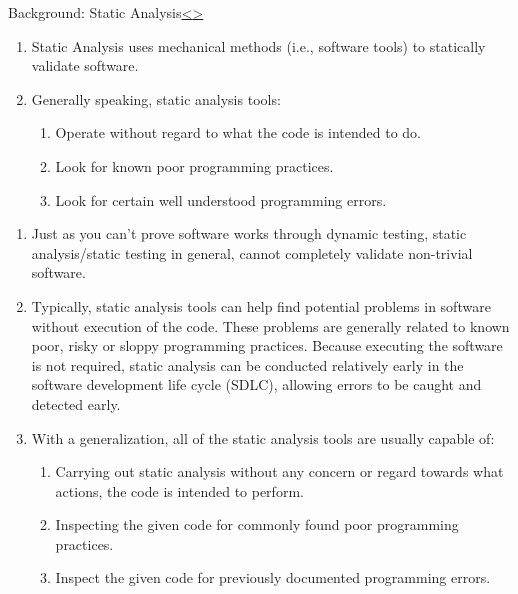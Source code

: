 \documentclass[12pt]{extarticle}
\newenvironment{instructionblock}{\Large\bgroup}{\egroup}
\newcommand{\ben}{\begin{enumerate}}
\newcommand{\een}{\end{enumerate}}
\begin{document}


\pagebreak
\begin{slide}{Background: Static Analysis}{\hyperref[slide 7]{\textless}\hyperref[slide 9]{\textgreater}}
	\vskip 10pt
	\begin{instructionblock}
		\begin{enumerate}
			\item Static Analysis uses mechanical methods (i.e., software tools) to statically validate software\cite{StaticAnalysisTools}.
			\item Generally speaking, static analysis tools:
			\ben
			\item Operate without regard to what the code is intended to do\cite{StaticAnalysisTools}.
			\item Look for known poor programming practices\cite{StaticAnalysisTools}.
			\item Look for certain well understood programming errors\cite{StaticAnalysisTools}.
			\een
		\end{enumerate}
	\end{instructionblock}
\end{slide}
\begin{enumerate}
\item Just as you can't prove software works through dynamic testing, static analysis/static testing in general, cannot completely validate non-trivial software\cite{WikipediaHaltingProblem}\cite{WikipediaStaticAnalysis}.
\item Typically, static analysis tools can help find potential problems in software without execution of the code. These problems are generally related to known poor, risky or sloppy programming practices\cite{StaticAnalysisTools}.  Because executing the software is not required, static analysis can be conducted relatively early in the software development life cycle (SDLC), allowing errors to be caught and detected early.
\item With a generalization, all of the static analysis tools are usually capable of:
	\ben
		\item Carrying out static analysis without any concern or regard towards what actions, the code is intended to perform.
		\item Inspecting the given code for commonly found poor programming practices.
		\item Inspect the given code for previously documented programming errors.
	\een 
\end{enumerate}
\end{document}
